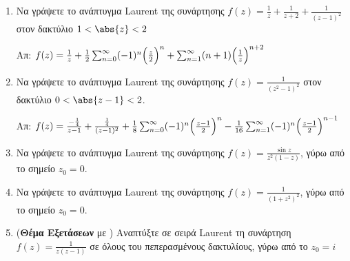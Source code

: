 \begin{enumerate}
\item Να γράψετε το ανάπτυγμα Laurent της συνάρτησης $f(z)=\frac{1}{z}+\frac{1}{z+2}+\frac{1}{(z-1)^2}$ στον δακτύλιο $1<\abs{z}<2$

\hfill Απ: $f(z)=\frac{1}{z}+\frac{1}{2}\sum_{n=0}^{\infty}(-1)^n\Bigl(\frac{z}{2}\Bigr)^n+\sum_{n=1}^{\infty}(n+1)\Bigl(\frac{1}{z}\Bigr)^{n+2}$

\item Να γράψετε το ανάπτυγμα Laurent της συνάρτησης $f(z)=\frac{1}{(z^2-1)^2}$ στον δακτύλιο $0<\abs{z-1}<2$.

\hfill Απ: $f(z)=\frac{-\frac{1}{4}}{z-1}+\frac{\frac{1}{4}}{(z-1)^2}+\frac{1}{8}\sum_{n=0}^{\infty}(-1)^n\Bigl(\frac{z-1}{2}\Bigr)^n-\frac{1}{16}\sum_{n=1}^{\infty}(-1)^n\Bigl(\frac{z-1}{2}\Bigr)^{n-1}$

\item Να γράψετε το ανάπτυγμα Laurent της συνάρτησης $f(z)=\frac{\sin z}{z^2(1-z)}$, γύρω από το σημείο $z_0=0$.

\item Να γράψετε το ανάπτυγμα Laurent της συνάρτησης $f(z)=\frac{1}{(1+z^2)^2}$, γύρω από το σημείο $z_0=0$.

\item (\textbf{Θέμα Εξετάσεων} με \unboldmath) Αναπτύξτε σε σειρά Laurent τη συνάρτηση $f(z)=\frac{1}{z(z-1)}$ σε όλους του πεπερασμένους δακτυλίους, γύρω από το $z_0=i$

\end{enumerate}





